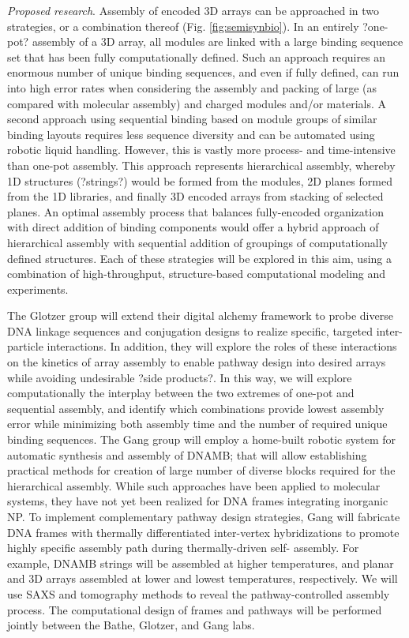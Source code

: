 \textit{Proposed research}. Assembly of encoded 3D arrays can be approached in two strategies, or a combination thereof (Fig. \ref{fig:semisynbio}). In an entirely ?one-pot? assembly of a 3D array, all modules are linked with a large binding sequence set that has been fully computationally defined. Such an approach requires an enormous number of unique binding sequences, and even if fully defined, can run into high error rates when considering the assembly and packing of large (as compared with molecular assembly) and charged modules and/or materials. A second approach using sequential binding based on module groups of similar binding layouts requires less sequence diversity and can be automated using robotic liquid handling. However, this is vastly more process- and time-intensive than one-pot assembly. This approach represents hierarchical assembly, whereby 1D structures (?strings?) would be formed from the modules, 2D planes formed from the 1D libraries, and finally 3D encoded arrays from stacking of selected planes. An optimal assembly process that balances fully-encoded organization with direct addition of binding components would offer a hybrid approach of hierarchical assembly with sequential addition of groupings of computationally defined structures. Each of these strategies will be explored in this aim, using a combination of high-throughput, structure-based computational modeling and experiments.

The Glotzer group will extend their digital alchemy framework to probe diverse DNA linkage sequences and conjugation designs to realize specific, targeted inter-particle interactions. In addition, they will explore the roles of these interactions on the kinetics of array assembly to enable pathway design \cite{Jankowski_2012_SoftMatter} into desired arrays while avoiding undesirable ?side products?. In this way, we will explore computationally the interplay between the two extremes of one-pot and sequential assembly, and identify which combinations provide lowest assembly error while minimizing both assembly time and the number of required unique binding sequences. The Gang group will employ a home-built robotic system for automatic synthesis and assembly of DNAMB; that will allow establishing practical methods for creation of large number of diverse blocks required for the hierarchical assembly. While such approaches have been applied to molecular systems, they have not yet been realized for DNA frames integrating inorganic NP. To implement complementary pathway design strategies, Gang will fabricate DNA frames with thermally differentiated inter-vertex hybridizations to promote highly specific assembly path during thermally-driven self- assembly. For example, DNAMB strings will be assembled at higher temperatures, and planar and 3D arrays assembled at lower and lowest temperatures, respectively. We will use SAXS and tomography methods to reveal the pathway-controlled assembly process. The computational design of frames and pathways will be performed jointly between the Bathe, Glotzer, and Gang labs.

